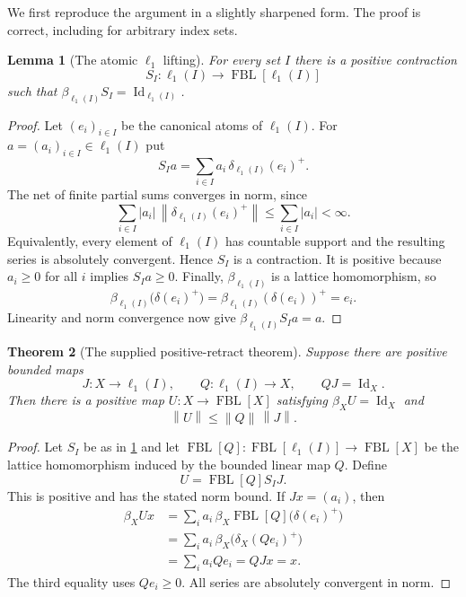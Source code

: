 \documentclass[11pt]{article}
\newtheorem{theorem}{Theorem}[section]
\newtheorem{lemma}[theorem]{Lemma}
\newcommand{\FBL}{\operatorname{FBL}}
\newcommand{\Id}{\operatorname{Id}}
\newcommand{\norm}[1]{\left\lVert #1\right\rVert}
\begin{document}
We first reproduce the argument in a slightly sharpened form.  The proof is
correct, including for arbitrary index sets.

\begin{lemma}[The atomic $\ell_1$ lifting]\label{lem:l1}
For every set $I$ there is a positive contraction
\[
 S_I:\ell_1(I)\longrightarrow \FBL[\ell_1(I)]
\]
such that $\beta_{\ell_1(I)}S_I=\Id_{\ell_1(I)}$.
\end{lemma}

\begin{proof}
Let $(e_i)_{i\in I}$ be the canonical atoms of $\ell_1(I)$.  For
$a=(a_i)_{i\in I}\in\ell_1(I)$ put
\[
 S_Ia=\sum_{i\in I}a_i\,\delta_{\ell_1(I)}(e_i)^+.
\]
The net of finite partial sums converges in norm, since
\[
 \sum_{i\in I}|a_i|\,
 \norm{\delta_{\ell_1(I)}(e_i)^+}
 \leq \sum_{i\in I}|a_i|<\infty.
\]
Equivalently, every element of $\ell_1(I)$ has countable support and the
resulting series is absolutely convergent.  Hence $S_I$ is a contraction.  It
is positive because $a_i\geq0$ for all $i$ implies $S_Ia\geq0$.  Finally,
$\beta_{\ell_1(I)}$ is a lattice homomorphism, so
\[
 \beta_{\ell_1(I)}\bigl(\delta(e_i)^+\bigr)
 =\beta_{\ell_1(I)}(\delta(e_i))^+=e_i.
\]
Linearity and norm convergence now give
$\beta_{\ell_1(I)}S_Ia=a$.
\end{proof}

\begin{theorem}[The supplied positive-retract theorem]\label{thm:retract}
Suppose there are positive bounded maps
\[
 J:X\longrightarrow\ell_1(I),
 \qquad Q:\ell_1(I)\longrightarrow X,
 \qquad QJ=\Id_X.
\]
Then there is a positive map $U:X\to\FBL[X]$ satisfying
$\beta_XU=\Id_X$ and
\[
 \norm U\leq \norm Q\,\norm J.
\]
\end{theorem}

\begin{proof}
Let $S_I$ be as in \cref{lem:l1} and let
$\FBL[Q]:\FBL[\ell_1(I)]\to\FBL[X]$ be the lattice homomorphism induced by
the bounded linear map $Q$.  Define
\[
 U=\FBL[Q]S_IJ.
\]
This is positive and has the stated norm bound.  If $Jx=(a_i)$, then
\begin{align*}
 \beta_XUx
 &=\sum_i a_i\,\beta_X\FBL[Q]\bigl(\delta(e_i)^+\bigr)\\
 &=\sum_i a_i\,\beta_X\bigl(\delta_X(Qe_i)^+\bigr)\\
 &=\sum_i a_i Qe_i
 =QJx=x.
\end{align*}
The third equality uses $Qe_i\geq0$.  All series are absolutely convergent in
norm.
\end{proof}
\end{document}
